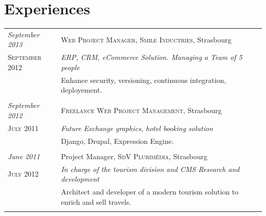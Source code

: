 \documentclass[a4paper,10pt]{article}
\begin{document}
\section{Experiences}
\begin{tabular}{p{}|p{}}	

	\emph{September 2013} & \textsc{Web Project Manager, Smile Inductries}, Strasbourg \\\textsc{September 2012}&\emph{ERP, CRM, eCommerce Solution. Managing a Team of 5 people}\\&\footnotesize{Enhance security, versioning, continuous integration, deployement.}\\\multicolumn{2}{c}{} \\

	\emph{September 2012} & \textsc{Freelance Web Project Management}, Strasbourg \\\textsc{July 2011}&\emph{Future Exchange graphics, hotel booking solution}\\&\footnotesize{Django, Drupal, Expression Engine.}\\\multicolumn{2}{c}{} \\

  \emph{June 2011} & Project Manager, \textsc{SdV Plurimédia}, Strasbourg \\\textsc{July 2012}&\emph{ In charge of the tourism division and CMS Research and development  }\\&\footnotesize{Architect and developer of a modern tourism solution to enrich and sell travels.}\\\multicolumn{2}{c}{} \\
  

\end{tabular}
\end{document}
